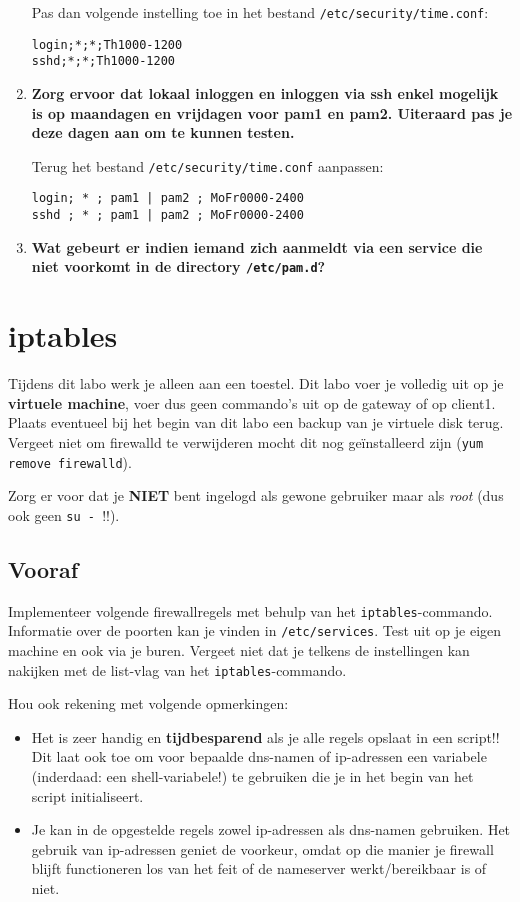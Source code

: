 \documentclass{report}
\begin{document}
\begin{enumerate}
	Pas dan volgende instelling toe in het bestand \texttt{/etc/security/time.conf}:
	\begin{lstlisting}
login;*;*;Th1000-1200
sshd;*;*;Th1000-1200
	\end{lstlisting}
	
	\item \textbf{Zorg ervoor dat lokaal inloggen en inloggen via ssh enkel mogelijk is op maandagen en vrijdagen voor pam1 en pam2. Uiteraard pas je deze dagen aan om te kunnen testen.}
	
	Terug het bestand \texttt{/etc/security/time.conf} aanpassen:
	\begin{lstlisting}
login; * ; pam1 | pam2 ; MoFr0000-2400
sshd ; * ; pam1 | pam2 ; MoFr0000-2400
	\end{lstlisting}
	\item \textbf{Wat gebeurt er indien iemand zich aanmeldt via een service die niet voorkomt in de directory \texttt{/etc/pam.d}?}
\end{enumerate}

\chapter{iptables}
Tijdens dit labo werk je alleen aan een toestel. Dit labo voer je volledig uit op je \textbf{virtuele machine}, voer dus geen commando's uit op de gateway of op client1. Plaats eventueel bij het begin van dit labo een backup van je virtuele disk terug. Vergeet niet om firewalld te verwijderen mocht dit nog geïnstalleerd zijn (\texttt{yum remove firewalld}).

Zorg er voor dat je \textbf{NIET} bent ingelogd als gewone gebruiker maar als \emph{root} (dus ook geen \texttt{su - }!!).
\section{Vooraf} 
Implementeer volgende firewallregels met behulp van het \texttt{iptables}-commando. Informatie over de poorten kan je vinden in \texttt{/etc/services}.
Test uit op je eigen machine en ook via je buren. Vergeet niet dat je telkens de instellingen kan nakijken met de list-vlag van het \texttt{iptables}-commando.

Hou ook rekening met volgende opmerkingen:
\begin{itemize}
	\item Het is zeer handig en \textbf{tijdbesparend} als je alle regels opslaat in een script!! Dit laat ook toe om voor bepaalde dns-namen of ip-adressen een variabele (inderdaad: een shell-variabele!) te gebruiken die je in het begin van het script initialiseert.
    \item Je kan in de opgestelde regels zowel ip-adressen als dns-namen gebruiken. Het gebruik van ip-adressen geniet de voorkeur, omdat op die manier je firewall blijft functioneren los van het feit of de nameserver werkt/bereikbaar is of niet.
\end{itemize}
    
\end{document}

